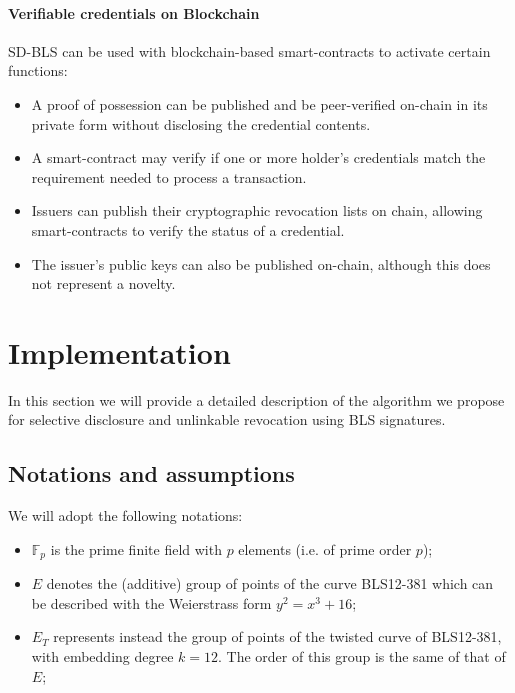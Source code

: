 \paragraph{Verifiable credentials on Blockchain}
SD-BLS can be used with blockchain-based smart-contracts to activate
certain functions:
\begin{itemize}
    \item A proof of possession can be published and be peer-verified
      on-chain in its private form without disclosing the credential
      contents.
    \item A smart-contract may verify if one or more holder's
      credentials match the requirement needed to process a
      transaction.
    \item Issuers can publish their cryptographic revocation lists on
      chain, allowing smart-contracts to verify the status of a
      credential.
    \item The issuer's public keys can also be published on-chain,
      although this does not represent a novelty.
\end{itemize}

\section{Implementation}

In this section we will provide a detailed description of the
algorithm we propose for selective disclosure and unlinkable
revocation using BLS signatures.

\subsection{Notations and assumptions}

We will adopt the following notations:
\begin{itemize}

\item $\mathbb{F}_p$ is the prime finite field with $p$ elements
  (i.e. of prime order $p$);

\item $E$ denotes the (additive) group of points of the curve
  BLS12-381 \cite{bls381-12} which can be described with the
  Weierstrass form $y^2=x^3 + 16$;

\item $E_T$ represents instead the group of points of the twisted
  curve of BLS12-381, with embedding degree $k=12$. The order of
  this group is the same of that of $E$;

\end{itemize}

